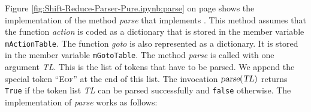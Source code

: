 Figure \ref{fig:Shift-Reduce-Parser-Pure.ipynb:parse} on page \pageref{fig:Shift-Reduce-Parser-Pure.ipynb:parse}
shows the implementation of the method \textsl{parse} that implements .  
This method assumes that the function \textsl{action} is coded
as a dictionary that is stored in the member variable \texttt{mActionTable}.
The function \textsl{goto} is also represented as a dictionary.  It is stored in the
member variable \texttt{mGotoTable}.  The method \textsl{parse} is called with one
argument \textsl{TL}.  This is the list of tokens that have to be parsed.  We append the special token
``\textsc{Eof}'' at the end of this list.  The invocation  
$\textsl{parse}(\textsl{TL})$ returns \texttt{True} if the token list \textsl{TL} can be
parsed successfully and \texttt{false} otherwise.  The implementation of \textsl{parse} works as follows:
